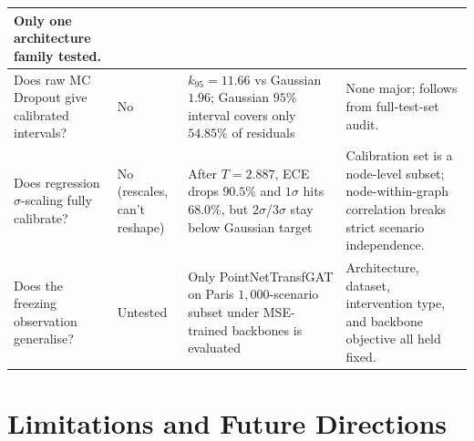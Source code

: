 \begin{table}[htbp]
\begin{tabular}{p{3.6cm}p{2.0cm}p{4.2cm}p{3.7cm}}
Only one architecture family tested. \\
\midrule
Does raw MC Dropout give calibrated intervals? &
No &
$k_{95} = 11.66$ vs Gaussian $1.96$; Gaussian $95\%$ interval covers only $54.85\%$ of residuals &
None major; follows from full-test-set audit. \\
\midrule
Does regression $\sigma$-scaling fully calibrate? &
No (rescales, can't reshape) &
After $T = 2.887$, ECE drops $90.5\%$ and $1\sigma$ hits $68.0\%$, but $2\sigma$/$3\sigma$ stay below Gaussian target &
Calibration set is a node-level subset; node-within-graph correlation breaks strict scenario independence. \\
\midrule
Does the freezing observation generalise? &
Untested &
Only PointNetTransfGAT on Paris $1{,}000$-scenario subset under MSE-trained backbones is evaluated &
Architecture, dataset, intervention type, and backbone objective all held fixed. \\
\bottomrule
\end{tabular}
\end{table}

\section{Limitations and Future Directions}\label{sec:limitations}

